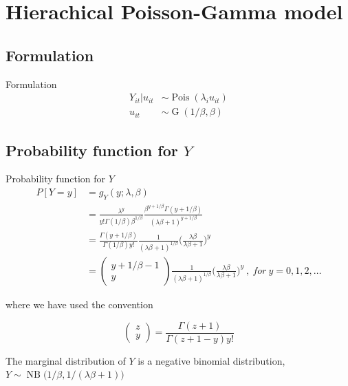 \documentclass[aspectratio=169]{beamer}
\DeclareMathOperator{\G}{G}
\DeclareMathOperator{\NB}{NB}
\DeclareMathOperator{\Pois}{Pois}
\begin{document}
\hypertarget{hierachical-poisson-gamma-model}{%
\section{Hierachical Poisson-Gamma
model}\label{hierachical-poisson-gamma-model}}

\hypertarget{formulation}{%
\subsection{Formulation}\label{formulation}}

\begin{frame}{Formulation}
\begin{subequations} \label{eq:PoisGam}
  \begin{alignat}{2}
    Y_{it}|u_{it} &\sim \Pois (\lambda_{i} u_{it}) \label{eq:pois_g0} \\ 
    u_{it} &\sim \G(1/\beta,\beta) \label{eq:pois_g1}
  \end{alignat}
\end{subequations}
\end{frame}

\hypertarget{probability-function-for-y}{%
\subsection{\texorpdfstring{Probability function for
\(Y\)}{Probability function for Y}}\label{probability-function-for-y}}

\begin{frame}{Probability function for \(Y\)}
\begin{equation} \label{eq:pdfMix}
  \begin{aligned}
    P[Y=y]&=g_{Y}(y;\lambda, \beta) \\
    &=\frac{\lambda^{y}}{y!\Gamma(1/\beta)\beta^{1/\beta}}\frac{\beta^{y+1/\beta}\Gamma(y+1/\beta)}{(\lambda \beta + 1)^{y+1/\beta}} \\
    &=\frac{\Gamma(y+1/\beta)}{\Gamma(1/\beta)y!}\frac{1}{(\lambda\beta+1)^{1/\beta}}\bigg(\frac{\lambda\beta}{\lambda\beta+1}\bigg)^{y} \\
    &=\begin{pmatrix} y+1/\beta-1 \\ y \end{pmatrix} \frac{1}{(\lambda\beta+1)^{1/\beta}}\bigg(\frac{\lambda\beta}{\lambda\beta+1}\bigg)^{y} \ , \ for \ y = 0, 1, 2, \dots
  \end{aligned}
\end{equation}

where we have used the convention

\begin{equation}
  \begin{pmatrix} z\\y \end{pmatrix} = \frac{\Gamma(z+1)}{\Gamma(z+1-y)y!}
\end{equation}

The marginal distribution of \(Y\) is a negative binomial distribution,
\(Y\sim \NB\big(1/\beta,1/(\lambda \beta+1)\big)\)
\end{frame}
\end{document}
